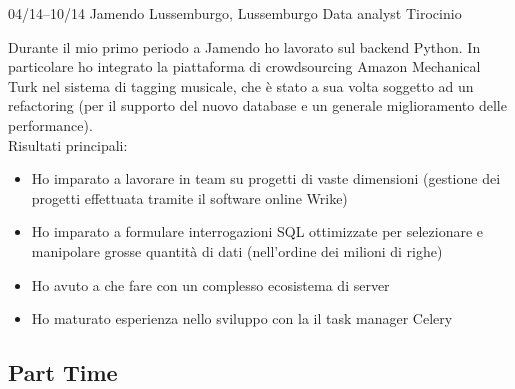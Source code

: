 \documentclass[print]{friggeri-custom} %
\begin{document}
\begin{entrylist}
\expentry
{04/14--10/14}
{Jamendo}
{Lussemburgo, Lussemburgo}
{Data analyst}
{Tirocinio}
{Durante il mio primo periodo a Jamendo ho lavorato sul backend Python. In particolare ho integrato la piattaforma di crowdsourcing Amazon Mechanical Turk nel sistema di tagging musicale, che è stato a sua volta soggetto ad un refactoring (per il supporto del nuovo database e un generale miglioramento delle performance). \\
Risultati principali:
\begin{itemize}
  \item Ho imparato a lavorare in team su progetti di vaste dimensioni (gestione dei progetti effettuata tramite il software online Wrike)
  \item Ho imparato a formulare interrogazioni SQL ottimizzate per selezionare e manipolare grosse quantità di dati (nell'ordine dei milioni di righe)
  \item Ho avuto a che fare con un complesso ecosistema di server
  \item Ho maturato esperienza nello sviluppo con la il task manager Celery
\end{itemize}}


\end{entrylist}

\subsection{Part Time}
\end{document}
